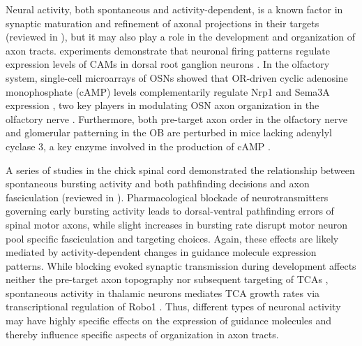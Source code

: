 \label{sec:Intrinsic2}
Neural activity, both spontaneous and activity-dependent, is a known factor in synaptic maturation and refinement of axonal projections in their targets (reviewed in ), but it may also play a role in the development and organization of axon tracts.
\Invitro{} experiments demonstrate that neuronal firing patterns regulate expression levels of CAMs in dorsal root ganglion neurons \cite{itoh1997activity}.
In the olfactory system, single-cell microarrays of OSNs showed that OR-driven cyclic adenosine monophosphate (cAMP) levels complementarily regulate Nrp1 and Sema3A expression \cite{imai2006odorant}, two key players in modulating OSN axon organization in the olfactory nerve \cite{imai2009pre}.
Furthermore, both pre-target axon order in the olfactory nerve and glomerular patterning in the OB are perturbed in mice lacking adenylyl cyclase 3, a key enzyme involved in the production of cAMP \cite{miller2010axon}.

A series of studies in the chick spinal cord demonstrated the relationship between spontaneous bursting activity and both pathfinding decisions and axon fasciculation (reviewed in ).
Pharmacological blockade of neurotransmitters governing early bursting activity leads to dorsal-ventral pathfinding errors of spinal motor axons, while slight increases in bursting rate disrupt motor neuron pool specific fasciculation and targeting choices.
Again, these effects are likely mediated by activity-dependent changes in guidance molecule expression patterns.
While blocking evoked synaptic transmission during development affects neither the pre-target axon topography nor subsequent targeting of TCAs \cite{molnar2002normal}, spontaneous activity in thalamic neurons mediates TCA growth rates via transcriptional regulation of Robo1 \cite{mire2012spontaneous}.
Thus, different types of neuronal activity may have highly specific effects on the expression of guidance molecules and thereby influence specific aspects of organization in axon tracts.